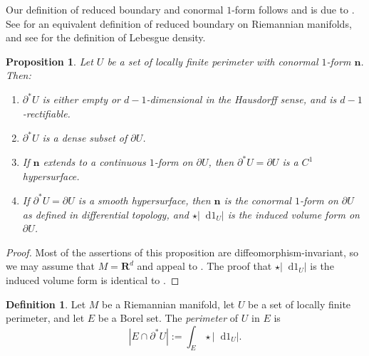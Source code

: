 \documentclass[reqno,12pt,letterpaper]{amsart}
\newcommand{\RR}{\mathbf{R}}
\newcommand*\dif{\mathop{}\!\mathrm{d}}
\newcommand{\normal}{\mathbf n}
\newcommand{\dfn}[1]{\emph{#1}\index{#1}}
\newtheorem{proposition}[theorem]{Proposition}
\theoremstyle{definition}
\newtheorem{definition}[theorem]{Definition}
\numberwithin{equation}{section}
\begin{document}
Our definition of reduced boundary and conormal $1$-form follows \cite[Definition 3.3]{Giusti77} and is due to \cite{deGiorgi55}.
See \cite{Battista_2021} for an equivalent definition of reduced boundary on Riemannian manifolds, and see \cite[Chapter 6]{Pugh02} for the definition of Lebesgue density.

\begin{proposition}\label{locality of Caccioppoli}
    Let $U$ be a set of locally finite perimeter with conormal $1$-form $\normal$.
    Then:
    \begin{enumerate}
    \item $\partial^* U$ is either empty or $d-1$-dimensional in the Hausdorff sense, and is $d-1$-rectifiable.
    \item $\partial^* U$ is a dense subset of $\partial U$.
    \item If $\normal$ extends to a continuous $1$-form on $\partial U$, then $\partial^* U = \partial U$ is a $C^1$ hypersurface.
    \item If $\partial^* U = \partial U$ is a smooth hypersurface, then $\normal$ is the conormal $1$-form on $\partial U$ as defined in differential topology, and $\star |\dif 1_U|$ is the induced volume form on $\partial U$.
\end{enumerate}
\end{proposition}
\begin{proof}
Most of the assertions of this proposition are diffeomorphism-invariant, so we may assume that $M = \RR^d$ and appeal to \cite[Chapters 2-4]{Giusti77}.
The proof that $\star |\dif 1_U|$ is the induced volume form is identical to \cite[Example 1.4]{Giusti77}.
\end{proof}

\begin{definition}
Let $M$ be a Riemannian manifold, let $U$ be a set of locally finite perimeter, and let $E$ be a Borel set.
The \dfn{perimeter} of $U$ in $E$ is
$$|E \cap \partial^* U| := \int_E \star |\dif 1_U|.$$
\end{definition}
\end{document}
